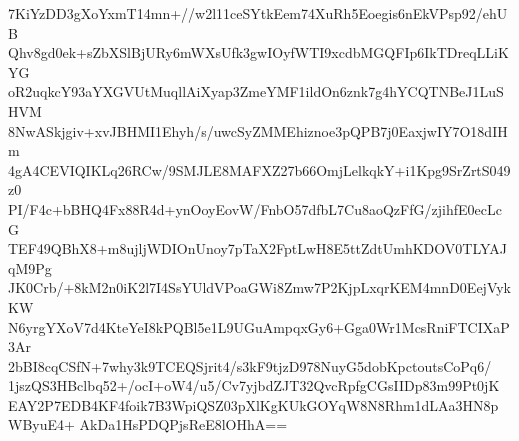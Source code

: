 7KiYzDD3gXoYxmT14mn+//w2l11ceSYtkEem74XuRh5Eoegis6nEkVPsp92/ehUB
Qhv8gd0ek+sZbXSlBjURy6mWXsUfk3gwIOyfWTI9xcdbMGQFIp6IkTDreqLLiKYG
oR2uqkcY93aYXGVUtMuqllAiXyap3ZmeYMF1ildOn6znk7g4hYCQTNBeJ1LuSHVM
8NwASkjgiv+xvJBHMI1Ehyh/s/uwcSyZMMEhiznoe3pQPB7j0EaxjwIY7O18dIHm
4gA4CEVIQIKLq26RCw/9SMJLE8MAFXZ27b66OmjLelkqkY+i1Kpg9SrZrtS049z0
PI/F4c+bBHQ4Fx88R4d+ynOoyEovW/FnbO57dfbL7Cu8aoQzFfG/zjihfE0ecLcG
TEF49QBhX8+m8ujljWDIOnUnoy7pTaX2FptLwH8E5ttZdtUmhKDOV0TLYAJqM9Pg
JK0Crb/+8kM2n0iK2l7I4SsYUldVPoaGWi8Zmw7P2KjpLxqrKEM4mnD0EejVykKW
N6yrgYXoV7d4KteYeI8kPQBl5e1L9UGuAmpqxGy6+Gga0Wr1McsRniFTCIXaP3Ar
2bBI8cqCSfN+7why3k9TCEQSjrit4/s3kF9tjzD978NuyG5dobKpctoutsCoPq6/
1jszQS3HBclbq52+/ocI+oW4/u5/Cv7yjbdZJT32QvcRpfgCGsIIDp83m99Pt0jK
EAY2P7EDB4KF4foik7B3WpiQSZ03pXlKgKUkGOYqW8N8Rhm1dLAa3HN8pWByuE4+
AkDa1HsPDQPjsReE8lOHhA==
